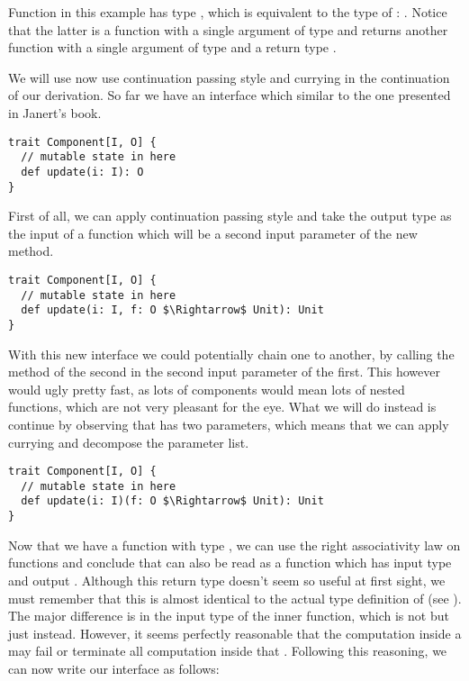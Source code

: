 Function  in this example has type , which is equivalent to the type of : . Notice that the latter is a function with a single argument of type  and returns another function with a single argument of type  and a return type .

We will use now use continuation passing style and currying in the continuation of our derivation. So far we have an interface which similar to the one presented in Janert's book.

\begin{lstlisting}[style=InlineScalaStyle]
trait Component[I, O] {
  // mutable state in here
  def update(i: I): O
}
\end{lstlisting}

First of all, we can apply continuation passing style and take the output type  as the input of a function which will be a second input parameter of the new  method.

\begin{lstlisting}[style=InlineScalaStyle]
trait Component[I, O] {
  // mutable state in here
  def update(i: I, f: O $\Rightarrow$ Unit): Unit
}
\end{lstlisting}

With this new interface we could potentially chain one \comp to another, by calling the  method of the second \comp in the second input parameter of the first. This however would ugly pretty fast, as lots of components would mean lots of nested functions, which are not very pleasant for the eye. What we will do instead is continue by observing that  has two parameters, which means that we can apply currying and decompose the parameter list.

\begin{lstlisting}[style=InlineScalaStyle]
trait Component[I, O] {
  // mutable state in here
  def update(i: I)(f: O $\Rightarrow$ Unit): Unit
}
\end{lstlisting}

Now that we have a function  with type , we can use the right associativity law on functions and conclude that  can also be read as a function which has input type  and output . Although this return type doesn't seem so useful at first sight, we must remember that this is almost identical to the actual type definition of \obs (see ). The major difference is in the input type of the inner function, which is not  but just  instead. However, it seems perfectly reasonable that the computation inside a \comp may fail or terminate all computation inside that \comp. Following this reasoning, we can now write our interface as follows:

